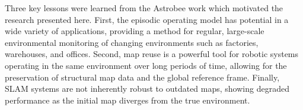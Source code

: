 Three key lessons were learned from the Astrobee work which motivated the research presented here. First, the episodic operating model has potential in a wide variety of applications, providing a method for regular, large-scale environmental monitoring of changing environments such as factories, warehouses, and offices. Second, map reuse is a powerful tool for robotic systems operating in the same environment over long periods of time, allowing for the preservation of structural map data and the global reference frame. Finally, SLAM systems are not inherently robust to outdated maps, showing degraded performance as the initial map diverges from the true environment.
